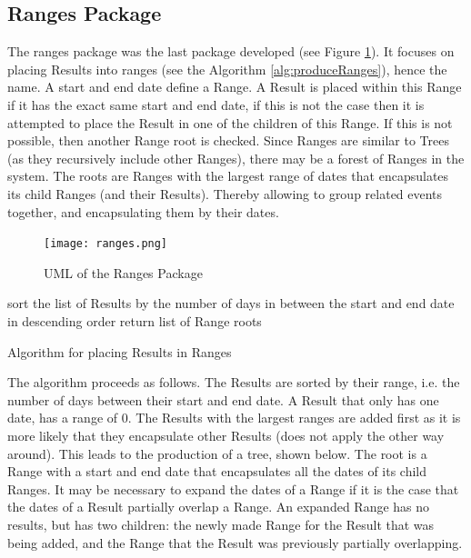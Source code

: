\subsection{Ranges Package}
\par The ranges package was the last package developed (see Figure \ref{fig:ranges}). It focuses on placing Results into ranges (see the Algorithm \ref{alg:produceRanges}), hence the name. A start and end date define a Range. A Result is placed within this Range if it has the exact same start and end date, if this is not the case then it is attempted to place the Result in one of the children of this Range. If this is not possible, then another Range root is checked. Since Ranges are similar to Trees (as they recursively include other Ranges), there may be a forest of Ranges in the system. The roots are Ranges with the largest range of dates that encapsulates its child Ranges (and their Results). Thereby allowing to group related events together, and encapsulating them by their dates.  
\begin{figure}[H]
\caption{UML of the Ranges Package}
\label{fig:ranges}
\texttt{[image: ranges.png]}
\centering
\end{figure}
\begin{algorithm}[H]
sort the list of Results by the number of days in between the start and end date in descending order\;
return list of Range roots\;
\caption{Algorithm for placing Results in Ranges}
\label{alg:produceRanges}
\end{algorithm}
\par The algorithm proceeds as follows. The Results are sorted by their range, i.e. the number of days between their start and end date. A Result that only has one date, has a range of 0. The Results with the largest ranges are added first as it is more likely that they encapsulate other Results (does not apply the other way around). This leads to the production of a tree, shown below. The root is a Range with a start and end date that encapsulates all the dates of its child Ranges. It may be necessary to expand the dates of a Range if it is the case that the dates of a Result partially overlap a Range. An expanded Range has no results, but has two children: the newly made Range for the Result that was being added, and the Range that the Result was previously partially overlapping.

